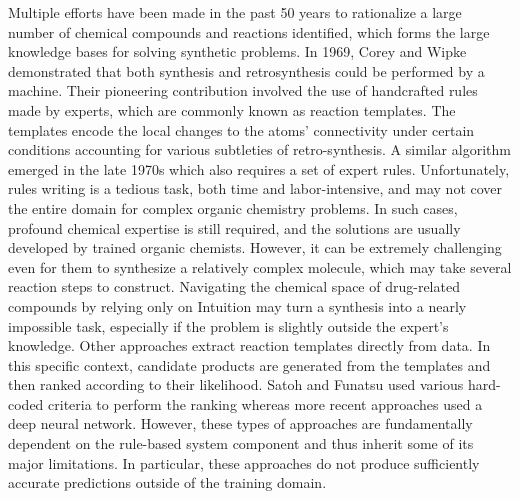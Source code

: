 \documentclass[%
 aip,
 jmp,%
 amsmath,amssymb,
 reprint,%
]{revtex4-2}
\begin{document}
Multiple efforts have been made in the past 50 years to rationalize a large number of chemical compounds and reactions identified, which forms the large knowledge bases for solving synthetic problems. In 1969, Corey and Wipke\cite{corey1969computer} demonstrated that both synthesis and retrosynthesis could be performed by a machine. Their pioneering contribution involved the use of handcrafted rules made by experts, which are commonly known as reaction templates. The templates encode the local changes to the atoms' connectivity under certain conditions accounting for various subtleties of retro-synthesis. A similar algorithm emerged in the late 1970s\cite{salatin1980computer} which also requires a set of expert rules. Unfortunately, rules writing is a tedious task, both time and labor-intensive, and may not cover the entire domain for complex organic chemistry problems. In such cases, profound chemical expertise is still required, and the solutions are usually developed by trained organic chemists.
However, it can be extremely challenging even for them to synthesize a relatively complex molecule, which may take several reaction steps to construct. Navigating the chemical space of drug-related compounds by relying only on Intuition may turn a synthesis into a nearly impossible task, especially if the problem is slightly outside the expert's knowledge. Other approaches extract reaction templates directly from data. In this specific context, candidate products are generated from the templates and then ranked according to their likelihood. Satoh and Funatsu\cite{satoh1995sophia, satoh1996further} used various hard-coded criteria to perform the ranking whereas more recent approaches\cite{segler2017neural,struble2020current} used a deep neural network. However, these types of approaches are fundamentally dependent on the rule-based system component and thus inherit some of its major limitations. In particular, these approaches do not produce sufficiently accurate predictions outside of the training domain.
\end{document}
